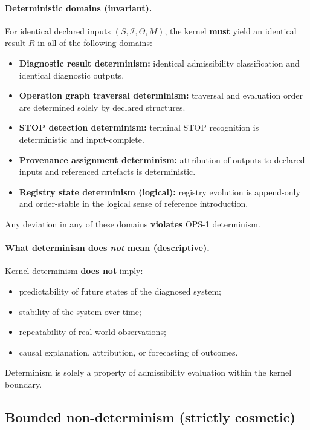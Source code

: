 \paragraph{Deterministic domains (invariant).}
For identical declared inputs $(S,\mathcal{I},\Theta,M)$,
the kernel \textbf{must} yield an identical result $R$
in all of the following domains:
\begin{itemize}
  \item \textbf{Diagnostic result determinism:}
        identical admissibility classification and identical diagnostic outputs.
  \item \textbf{Operation graph traversal determinism:}
        traversal and evaluation order are determined solely
        by declared structures.
  \item \textbf{STOP detection determinism:}
        terminal STOP recognition is deterministic and input-complete.
  \item \textbf{Provenance assignment determinism:}
        attribution of outputs to declared inputs and referenced artefacts
        is deterministic.
  \item \textbf{Registry state determinism (logical):}
        registry evolution is append-only and order-stable
        in the logical sense of reference introduction.
\end{itemize}

Any deviation in any of these domains \textbf{violates} OPS-1 determinism.

\paragraph{What determinism does \emph{not} mean (descriptive).}
Kernel determinism \textbf{does not} imply:
\begin{itemize}
  \item predictability of future states of the diagnosed system;
  \item stability of the system over time;
  \item repeatability of real-world observations;
  \item causal explanation, attribution, or forecasting of outcomes.
\end{itemize}

Determinism is solely a property of admissibility evaluation
within the kernel boundary.

\subsection{Bounded non-determinism (strictly cosmetic)}

